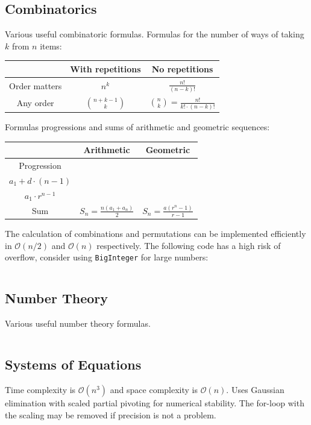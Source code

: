\documentclass[8pt,a4paper,landscape,oneside]{amsart}
\newcommand{\code}[1]{\inputminted[fontsize=\normalsize,baselinestretch=1]{java}{code/#1}}
\newcommand{\bigO}{\mathcal{O}}
\begin{document}
\begin{multicols*}{3}
  \subsection{Combinatorics}
  Various useful combinatoric formulas.
  Formulas for the number of ways of taking $k$ from $n$ items:
  \begin{center}
  \begin{tabular}{|c|c|c|} \hline
  & With repetitions & No repetitions \\
  \hline
  Order matters & $n^k$ & $\frac{n!}{(n-k)!}$ \\ \hline
  Any order & $\binom{n+k-1}{k}$ & $\binom{n}{k} = \frac{n!}{k!\cdot(n-k)!}$ \\ \hline
  \end{tabular}
  \end{center}
  Formulas progressions and sums of arithmetic and geometric sequences:
  \begin{center}
  \begin{tabular}{|c|c|c|} \hline
  & Arithmetic & Geometric \\
  \hline
  Progression & \shortstack{$a_n = a_{n-1} + d =$ \\ $a_1 + d\cdot(n-1)$} & \shortstack{$a_n = a_{n-1}\cdot r =$ \\ $a_1\cdot r^{n-1}$} \\ \hline
  Sum & $S_n = \frac{n(a_1+a_n)}{2}$ & $S_n = \frac{a(r^n-1)}{r-1}$ \\ \hline
  \end{tabular}
  \end{center}
  
  The calculation of combinations and permutations can be implemented efficiently in $\bigO(n/2)$ and $\bigO(n)$ respectively. The following code has a high risk of overflow, consider using \texttt{BigInteger} for large numbers:
  \code{Math/Combinatorics.java}
  
  \subsection{Number Theory}
  Various useful number theory formulas.
  \code{Math/Gcd.java}
  
  \subsection{Systems of Equations}
  Time complexity is $\bigO(n^3)$ and space complexity is $\bigO(n)$. Uses Gaussian elimination with scaled partial pivoting for numerical stability. The for-loop with the scaling may be removed if precision is not a problem.
  

\end{multicols*}
\end{document}
